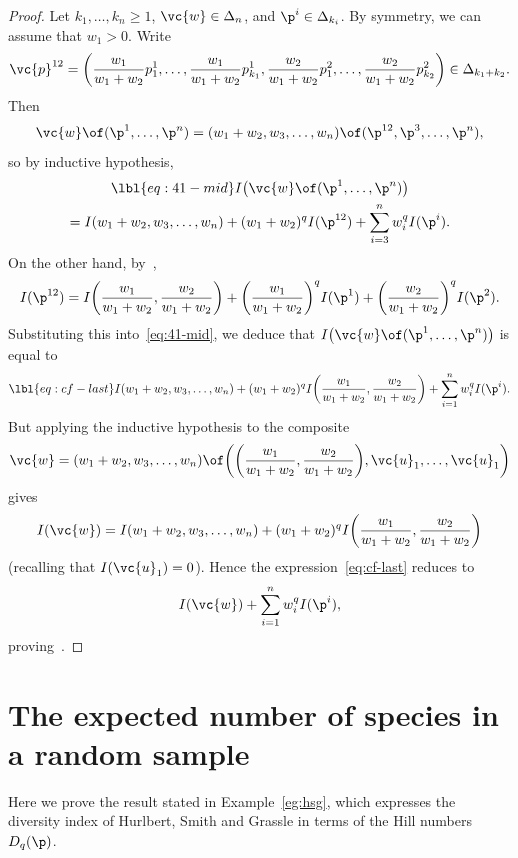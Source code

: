 \begin{proof}
Let $k_1, \ldots, k_n \geq 1$, $\vc{w} \in \Delta_n$, and $\p^i \in
\Delta_{k_i}$.  By symmetry, we can assume that $w_1 > 0$.  Write
\[
\vc{p}^{12} 
=
\biggl( 
\frac{w_1}{w_1 + w_2} p^1_1, \ldots, \frac{w_1}{w_1 + w_2} p^1_{k_1},
\frac{w_2}{w_1 + w_2} p^2_1, \ldots, \frac{w_2}{w_1 + w_2} p^2_{k_2}
\biggr)
\in 
\Delta_{k_1 + k_2}.
\]
Then
\[
\vc{w} \of (\p^1, \ldots, \p^n)
=
(w_1 + w_2, w_3, \ldots, w_n) \of (\p^{12}, \p^3, \ldots, \p^n),
\]
so by inductive hypothesis,
% 
\begin{multline}
\lbl{eq:41-mid}
I\bigl( \vc{w} \of (\p^1, \ldots, \p^n) \bigr) \\
=
I(w_1 + w_2, w_3, \ldots, w_n) + (w_1 + w_2)^q I(\p^{12}) 
+ \sum_{i = 3}^n w_i^q I(\p^i).
\end{multline}
% 
On the other hand, by~,
\[
I(\p^{12})
=
I\biggl( \frac{w_1}{w_1 + w_2}, \frac{w_2}{w_1 + w_2} \biggr)
+
\biggl( \frac{w_1}{w_1 + w_2} \biggr)^q I(\p^1)
+
\biggl( \frac{w_2}{w_1 + w_2} \biggr)^q I(\p^2).
\]
Substituting this into~\eqref{eq:41-mid}, we deduce that $I\bigl( \vc{w}
\of (\p^1, \ldots, \p^n) \bigr)$ is equal to
% 
\begin{equation}
\lbl{eq:cf-last}
I(w_1 + w_2, w_3, \ldots, w_n) 
+ 
(w_1 + w_2)^q I\biggl( \frac{w_1}{w_1 + w_2}, \frac{w_2}{w_1 + w_2} \biggr)
+
\sum_{i = 1}^n w_i^q I(\p^i).
\end{equation}
% 
But applying the inductive hypothesis to the composite
\[
\vc{w}
=
(w_1 + w_2, w_3, \ldots, w_n)
\of
\biggl( \biggl(  \frac{w_1}{w_1 + w_2}, \frac{w_2}{w_1 + w_2} \biggr),
\vc{u}_1, \ldots, \vc{u}_1 \biggr)
\]
gives
\[
I(\vc{w})
=
I(w_1 + w_2, w_3, \ldots, w_n)
+ 
(w_1 + w_2)^q I\biggl( \frac{w_1}{w_1 + w_2}, \frac{w_2}{w_1 + w_2} \biggr)
\]
(recalling that $I(\vc{u}_1) = 0$).  Hence the
expression~\eqref{eq:cf-last} reduces to
\[
I(\vc{w}) + \sum_{i = 1}^n w_i^q I(\p^i),
\]
proving~.
\end{proof}


\section{The expected number of species in a random sample}


Here we prove the result stated in Example~\ref{eg:hsg}, which expresses the
diversity index of Hurlbert, Smith and Grassle in terms of the Hill numbers
$D_q(\p)$.

